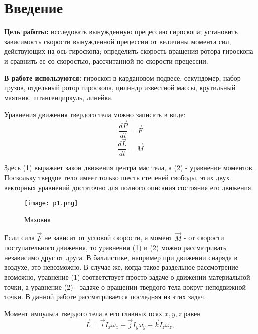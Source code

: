\section{Введение}

\textbf{Цель работы:}
исследовать вынужденную прецессию гироскопа; установить зависимость
скорости вынужденной прецессии от величины момента сил, действующих
на ось гироскопа; определить скорость вращения ротора гироскопа и
сравнить ее со скоростью, рассчитанной по скорости прецессии.


\textbf{В работе используются:}
гироскоп в кардановом подвесе, секундомер, набор грузов,
отдельный ротор гироскопа, цилиндр известной массы, крутильный
маятник, штангенциркуль, линейка.


Уравнения движения твердого тела можно записать в виде:
\begin{equation}
    \frac{d\vec{P}}{dt} = \vec F
\end{equation}
\begin{equation}
    \frac{d\vec L}{dt} = \vec M
\end{equation}

Здесь (1) выражает закон движения центра мас тела, а (2) -
уравнение моментов. Поскольку твердое тело имеет только шесть
степеней свободы, этих двух векторных уравнений достаточно для
полного описания состояния его движения.
\begin{wrapfigure}{r}{0.5\linewidth} %
\centering %
\texttt{[image: p1.png]}
\caption{Маховик} %
\label{pic:my} %
\end{wrapfigure}

Если сила $\vec F$ не зависит от угловой скорости, а момент
$\vec M$ - от скорости поступательного движения, то уравнения (1)
и (2) можно рассматривать независимо друг от друга. В баллистике,
например при движении снаряда в воздухе, это невозможно. В случае
же, когда такое раздельное рассмотрение возможно, уравнение (1)
соответствует просто задаче о движении материальной точки, а
уравнение (2) - задаче о вращении твердого тела вокруг неподвижной
точки. В данной работе рассматривается последняя из этих задач.

Момент импульса твердого тела в его главных осях $x, y, z$ равен
\begin{equation}
    \vec L = \vec iI_x\omega_x + \vec jI_y\omega_y + \vec kI_z\omega_z,
\end{equation}

